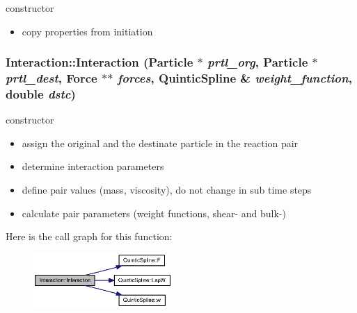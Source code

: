 constructor 



\begin{itemize}
\item copy properties from initiation \end{itemize}
\hypertarget{classInteraction_9c72b648e00a7bafabc6c96a10492801}{
\subsubsection[{Interaction}]{\setlength{\rightskip}{0pt plus 5cm}Interaction::Interaction ({\bf Particle} $\ast$ {\em prtl\_\-org}, \/  {\bf Particle} $\ast$ {\em prtl\_\-dest}, \/  {\bf Force} $\ast$$\ast$ {\em forces}, \/  {\bf QuinticSpline} \& {\em weight\_\-function}, \/  double {\em dstc})}}
\label{classInteraction_9c72b648e00a7bafabc6c96a10492801}


constructor 



\begin{itemize}
\item assign the original and the destinate particle in the reaction pair\end{itemize}


\begin{itemize}
\item determine interaction parameters\end{itemize}


\begin{itemize}
\item define pair values (mass, viscosity), do not change in sub time steps\end{itemize}


\begin{itemize}
\item calculate pair parameters (weight functions, shear- and bulk-) \end{itemize}


Here is the call graph for this function:\nopagebreak
\begin{figure}[H]
\begin{center}
\leavevmode
\includegraphics[width=149pt]{classInteraction_9c72b648e00a7bafabc6c96a10492801_cgraph}
\end{center}
\end{figure}


